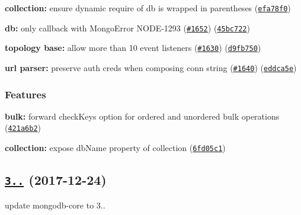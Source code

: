 \begin{DoxyItemize}
\item {\bfseries collection\+:} ensure dynamic require of {\ttfamily db} is wrapped in parentheses (\href{https://github.com/mongodb/node-mongodb-native/commit/efa78f0}{\tt efa78f0})
\item {\bfseries db\+:} only callback with Mongo\+Error N\+O\+D\+E-\/1293 (\href{https://github.com/mongodb/node-mongodb-native/issues/1652}{\tt \#1652}) (\href{https://github.com/mongodb/node-mongodb-native/commit/45bc722}{\tt 45bc722})
\item {\bfseries topology base\+:} allow more than 10 event listeners (\href{https://github.com/mongodb/node-mongodb-native/issues/1630}{\tt \#1630}) (\href{https://github.com/mongodb/node-mongodb-native/commit/d9fb750}{\tt d9fb750})
\item {\bfseries url parser\+:} preserve auth creds when composing conn string (\href{https://github.com/mongodb/node-mongodb-native/issues/1640}{\tt \#1640}) (\href{https://github.com/mongodb/node-mongodb-native/commit/eddca5e}{\tt eddca5e})
\end{DoxyItemize}

\subsubsection*{Features}


\begin{DoxyItemize}
\item {\bfseries bulk\+:} forward \textquotesingle{}check\+Keys\textquotesingle{} option for ordered and unordered bulk operations (\href{https://github.com/mongodb/node-mongodb-native/commit/421a6b2}{\tt 421a6b2})
\item {\bfseries collection\+:} expose {\ttfamily db\+Name} property of collection (\href{https://github.com/mongodb/node-mongodb-native/commit/6fd05c1}{\tt 6fd05c1})
\end{DoxyItemize}

\label{_3.0.1}%
 \subsection*{\href{https://github.com/mongodb/node-mongodb-native/compare/v3.0.0...v3.0.1}{\tt 3..} (2017-\/12-\/24)}


\begin{DoxyItemize}
\item update mongodb-\/core to 3..
\end{DoxyItemize}


